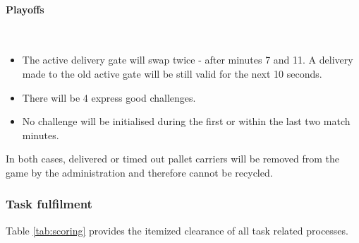 \documentclass[12pt,twoside]{article}
\begin{document}
\paragraph{Playoffs}~\\
\begin{itemize}
\item The active delivery gate will swap twice - after minutes 7
  and 11. A delivery made to the old active gate will be still
  valid for the next 10 seconds.
\item There will be 4 express good challenges. 
\item No challenge will be initialised during the first or within
  the last two match minutes.
\end{itemize}
     

In both cases, delivered or timed out pallet carriers will be removed
from the game by the administration and therefore cannot be recycled.

\subsubsection{Task fulfilment}

Table \ref{tab:scoring} provides the itemized clearance of all task
related processes.
\end{document}

